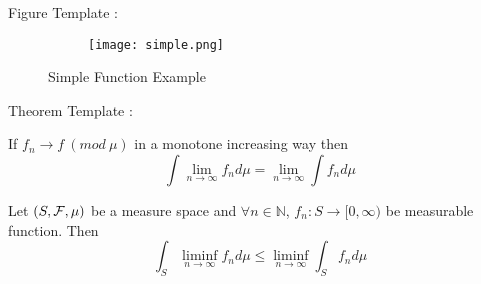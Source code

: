 \documentclass[final]{IEEEphot}
\begin{document}
Figure Template :

\begin{figure}[h!]
	\centering
	\begin{subfigure}{.6\textwidth}
		\centering
		\texttt{[image: simple.png]}
	\end{subfigure}
	\caption{Simple Function Example}
\end{figure}

Theorem Template :

\begin{theorem}
	If $f_n \rightarrow f~(mod~\mu)$ in a monotone increasing way then
	$$\int \lim_{n\rightarrow\infty}f_n d\mu = \lim_{n\rightarrow\infty}\int f_n d\mu$$

	\HL
\end{theorem}

\begin{theorem}
	Let $(S, \mathcal{F}, \mu)$ be a measure space and $\forall n \in \mathbb{N}$, $f_n : S \rightarrow [0,\infty)$ be measurable function. Then
	$$\int_S \liminf_{n\rightarrow\infty}f_n d\mu \leq \liminf_{n\rightarrow\infty} \int_S f_n d\mu$$

	\HL
\end{theorem}



%
%


\end{document}

